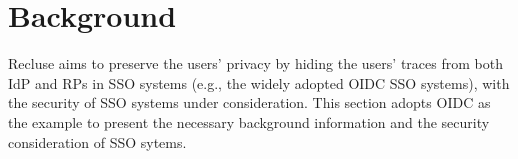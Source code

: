 \section{Background}
\label{sec:background}
Recluse aims to preserve the users' privacy by hiding the users' traces from both IdP and RPs in SSO systems (e.g., the widely adopted OIDC SSO systems), with the security of SSO systems under consideration. This section adopts OIDC as the example to present the necessary background information  and the security consideration of SSO sytems.


